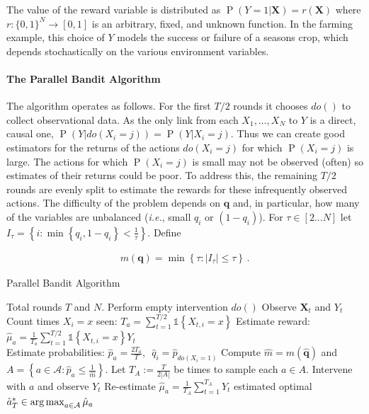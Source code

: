 \documentclass[11pt,a4paper,oneside]{book}
\newcommand{\actions}{\mathcal{A}}
\newcommand{\ie}{\textit{i.e.}}
\newcommand{\set}[1]{\left\{#1\right\}}
\newcommand{\ind}[1]{\mathds{1}\!\!\set{#1}}
\newcommand{\argmax}{\operatornamewithlimits{arg\,max}}
\newcommand{\eq}[1]{\begin{align*}#1\end{align*}}
\renewcommand{\P}[1]{\operatorname{P}\left(#1\right)}
\renewcommand{\vec}[1]{\boldsymbol{#1}}
\theoremstyle{plain}
\theoremstyle{definition}
\begin{document}
The value of the reward variable is distributed as $\P{Y = 1|\vec{X}} = r(\vec{X})$ where 
$r : \{0,1\}^N \to [0,1]$ is an arbitrary, fixed, and unknown function. 
In the farming example, this choice of $Y$ models the success or failure of a seasons crop, 
which depends stochastically on the various environment variables.


\paragraph{The Parallel Bandit Algorithm}
The algorithm operates as follows. For the first $T/2$ rounds it chooses $do()$ to collect observational data. As the only link from each $X_1,\ldots,X_N$ to $Y$ is a direct, causal one, $\P{Y|do(X_i=j)}=\P{Y|X_i=j}$. Thus we can create good estimators for the returns of the actions $do(X_i = j)$ for which $\P{X_i = j}$ is large. The actions for which $\P{X_i = j}$ is small may not be observed (often) so  estimates of their returns could be poor. To address this, the remaining $T/2$ rounds are evenly split to estimate the rewards for these infrequently observed actions. The difficulty of the problem depends on $\vec{q}$ and, in particular, how many of the variables are unbalanced (\ie, small $q_i$ or $(1-q_i)$). For $\tau \in [2...N]$ let $I_\tau = \set{ i : \min\set{q_i, 1-q_i} < \frac{1}{\tau}}$. Define

\eq{
\label{eq:m-simple}
m(\vec{q}) = \min \set{ \tau : |I_{\tau}| \leq \tau}\,.
}


\begin{algorithm}[H]
\caption{Parallel Bandit Algorithm}\label{alg:simple}
\begin{algorithmic}[1]
 Total rounds $T$ and $N$.
\STATE Perform empty intervention $do()$
\STATE Observe $\vec{X}_t$ and $Y_t$
\ENDFOR
\FOR{$a = do(X_i = x) \in \actions$}
\STATE Count times $X_i = x$ seen: $T_a = \sum_{t=1}^{T/2} \ind{X_{t,i} = x}$
\STATE Estimate reward: $\hat{\mu}_a = \frac{1}{T_a} \sum_{t=1}^{T/2} \ind{X_{t,i} = x} Y_t$ \\[0.2cm]
\STATE Estimate probabilities: $\hat{p}_a = \frac{2 T_a}{T}$,\,\, $\hat q_i = \hat p_{do(X_i = 1)}$
\ENDFOR
\STATE Compute $\hat{m} = m(\vec{\hat q})$ and $A = \set{a \in \actions \colon \hat{p}_a \leq \frac{1}{\hat m}}$.
\STATE Let $T_A := \frac{T}{2 |A|}$ be times to sample each $a\in A$.
\STATE Intervene with $a$ and observe $Y_t$
\ENDFOR
\STATE Re-estimate $\hat{\mu}_a = \frac{1}{T_A} \sum_{t=1}^{T_A} Y_t$
\ENDFOR
\RETURN estimated optimal $\hat{a}^*_T \in \argmax_{a\in\actions} \hat{\mu}_a$
\end{algorithmic}
\end{algorithm}
\end{document}
